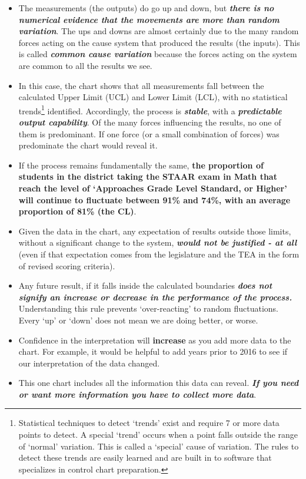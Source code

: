 \documentclass[
  letterpaper,
  DIV=11,
  numbers=noendperiod]{scrartcl}
\begin{document}
\begin{itemize}
\item
  The measurements (the outputs) do go up and down, but
  \textbf{\emph{there is no numerical evidence that the movements are
  more than random variation}}. The ups and downs are almost certainly
  due to the many random forces acting on the cause system that produced
  the results (the inputs). This is called \textbf{\emph{common cause
  variation}} because the forces acting on the system are common to all
  the results we see.
\item
  In this case, the chart shows that all measurements fall between the
  calculated Upper Limit (UCL) and Lower Limit (LCL), with no
  statistical trends\footnote{Statistical techniques to detect `trends'
    exist and require 7 or more data points to detect. A special `trend'
    occurs when a point falls outside the range of `normal' variation.
    This is called a `special' cause of variation. The rules to detect
    these trends are easily learned and are built in to software that
    specializes in control chart preparation.} identified. Accordingly,
  the process is \textbf{\emph{stable}}, with a
  \textbf{\emph{predictable output capability}}. Of the many forces
  influencing the results, no one of them is predominant. If one force
  (or a small combination of forces) was predominate the chart would
  reveal it.
\end{itemize}

\begin{itemize}
\item
  If the process remains fundamentally the same, \textbf{the proportion
  of students in the district taking the STAAR exam in Math that reach
  the level of `Approaches Grade Level Standard, or Higher' will
  continue to fluctuate between 91\% and 74\%, with an average
  proportion of 81\% (the CL)}.
\item
  Given the data in the chart, any expectation of results outside those
  limits, without a significant change to the system,
  \textbf{\emph{would not be justified - at all}} (even if that
  expectation comes from the legislature and the TEA in the form of
  revised scoring criteria).
\item
  Any future result, if it falls inside the calculated boundaries
  \textbf{\emph{does not signify an increase or decrease in the
  performance of the process.}} Understanding this rule prevents
  `over-reacting' to random fluctuations. Every `up' or `down' does not
  mean we are doing better, or worse.
\item
  Confidence in the interpretation will \textbf{increase} as you add
  more data to the chart. For example, it would be helpful to add years
  prior to 2016 to see if our interpretation of the data changed.
\item
  This one chart includes all the information this data can reveal.
  \textbf{\emph{If you need or want more information you have to collect
  more data}}.
\end{itemize}
\end{document}
